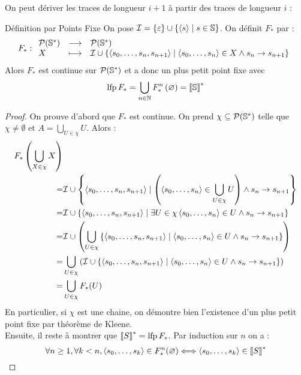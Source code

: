 \documentclass{cours}
\begin{document}
On peut dériver les traces de longueur $i + 1$ à partir des traces de longueur $i$ : 
\begin{théorème}{Définition par Points Fixe}
    On pose $\mathcal{I} = \{\varepsilon\} \cup \left\{\left\langle s \right\rangle \mid s \in \mathbb{S}\right\}$. On définit $F_{*}$ par : 
    \[
        F_{*} : \begin{array}{lcl}
            \mathcal{P}(\mathbb{S}^{*}) & \longrightarrow & \mathcal{P}(\mathbb{S}^{*})\\
            X & \longmapsto & \mathcal{I} \cup \left\{\left\langle s_{0}, \ldots, s_{n}, s_{n + 1} \right\rangle\mid \left\langle s_{0}, \ldots, s_{n} \right\rangle \in X \land s_{n} \to s_{n + 1}\right\}
        \end{array}
    \]
    Alors $F_{*}$ est continue sur $\mathcal{P}(\mathbb{S}^{*})$ et a donc un plus petit point fixe avec
    \[
        \operatorname{lfp} F_{*} = \bigcup_{n \in \mathbb{N}} F_{*}^{n}\left(\varnothing\right) = \left\llbracket \mathbb{S} \right\rrbracket^{*}
    \]
\end{théorème} 
\begin{proof}
    On prouve d'abord que $F_{*}$ est continue. On prend $\chi \subseteq \mathcal{P}(\mathbb{S}^{*})$ telle que $\chi \neq \emptyset$ et $A = \bigcup_{U \in \chi} U$. Alors : 
    \[\begin{aligned}
        F_{*}\left(\bigcup_{X \in \chi}X\right)&\\
        = &\mathcal{I} \cup \left\{\left\langle s_{0}, \ldots, s_{n}, s_{n + 1} \right\rangle \mid \left(\left\langle s_{0}, \ldots, s_{n} \right\rangle \in \bigcup_{U \in \chi} U\right) \land s_{n} \rightarrow s_{n + 1}\right\}\\
        = &\mathcal{I} \cup \left\{\left\langle s_{0}, \ldots, s_{n}, s_{n + 1} \right\rangle \mid \exists U \in \chi \left\langle s_{0}, \ldots, s_{n} \right\rangle \in U \land s_{n} \rightarrow s_{n + 1}\right\}\\
        = &\mathcal{I} \cup \left(\bigcup_{U \in \chi} \left\{\left\langle s_{0}, \ldots, s_{n}, s_{n + 1} \right\rangle\mid \left\langle s_{0}, \ldots, s_{n} \right\rangle\in U \land s_{n} \rightarrow s_{n + 1}\right\}\right)\\
        = &\bigcup_{U \in \chi}\left(\mathcal{I} \cup \left\{\left\langle s_{0}, \ldots, s_{n}, s_{n + 1} \right\rangle \mid \left\langle s_{0}, \ldots, s_{n} \right\rangle \in U \land s_{n} \rightarrow s_{n + 1}\right\}\right)\\
        = &\bigcup_{U \in \chi} F_{*}(U)
    \end{aligned}\]
    En particulier, si $\chi$ est une chaine, on démontre bien l'existence d'un plus petit point fixe par théorème de Kleene. \\
    Ensuite, il reste à montrer que $\left\llbracket S \right\rrbracket^{*} = \operatorname{lfp} F_{*}$. Par induction sur $n$ on a : 
    \[
        \forall n \geq 1, \forall k < n, \left\langle s_{0}, \ldots, s_{k} \right\rangle \in F_{*}^{n}(\varnothing) \Longleftrightarrow \left\langle s_{0}, \ldots, s_{k} \right\rangle \in \left\llbracket S \right\rrbracket^{*}
    \]
\end{proof}
\end{document}
